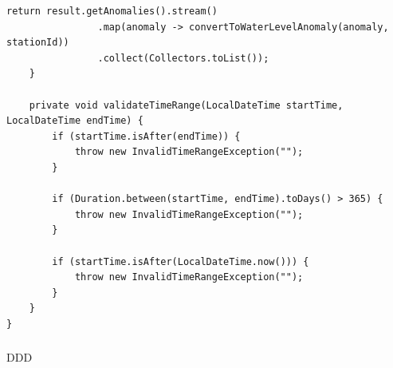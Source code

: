 \begin{lstlisting}[style=java]
        return result.getAnomalies().stream()
                .map(anomaly -> convertToWaterLevelAnomaly(anomaly, stationId))
                .collect(Collectors.toList());
    }
    
    private void validateTimeRange(LocalDateTime startTime, LocalDateTime endTime) {
        if (startTime.isAfter(endTime)) {
            throw new InvalidTimeRangeException("");
        }
        
        if (Duration.between(startTime, endTime).toDays() > 365) {
            throw new InvalidTimeRangeException("");
        }
        
        if (startTime.isAfter(LocalDateTime.now())) {
            throw new InvalidTimeRangeException("");
        }
    }
}
\end{lstlisting}

\hypertarget{section-75}{%
\subsubsection{}\label{section-75}}

DDD

